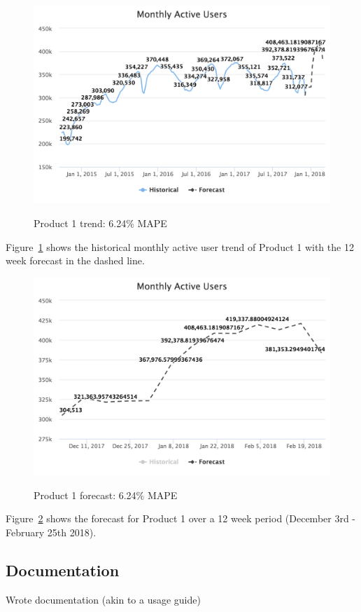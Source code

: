 \documentclass[11pt, oneside]{article}
\begin{document}
\begin{figure}[h]
  \caption{Product 1 trend: 6.24\% MAPE}
  \centering
  \includegraphics[width=12.5cm]{images/Product_1-Trend-6_24_Percent_MAPE.png}
  \label{fig:Product_1-Trend}
\end{figure}

Figure~\ref{fig:Product_1-Trend} shows the historical monthly active user trend of Product 1 with the 12 week forecast in the dashed line.

\begin{figure}[h]
  \caption{Product 1 forecast: 6.24\% MAPE}
  \centering
  \includegraphics[width=12.5cm]{images/Product_1-Forecast-6_24_Percent_MAPE.png}
  \label{fig:Product_1-Forecast}
\end{figure}

Figure~\ref{fig:Product_1-Forecast} shows the forecast for Product 1 over a 12 week period (December 3rd - February 25th 2018).

\subsection{Documentation}
Wrote documentation (akin to a usage guide)
\end{document}
